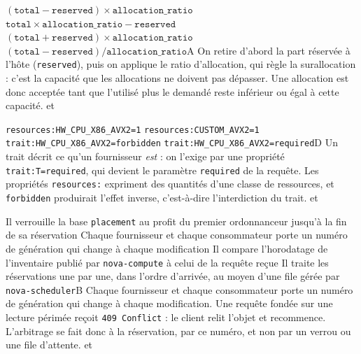   {$(\texttt{total}-\texttt{reserved})\times\texttt{allocation\_ratio}$}
  {$\texttt{total}\times\texttt{allocation\_ratio}-\texttt{reserved}$}
  {$(\texttt{total}+\texttt{reserved})\times\texttt{allocation\_ratio}$}
  {$(\texttt{total}-\texttt{reserved})/\texttt{allocation\_ratio}$}{A}
  {On retire d'abord la part réservée à l'hôte (\texttt{reserved}), puis on applique le ratio d'allocation, qui règle la surallocation : c'est la capacité que les allocations ne doivent pas dépasser. Une allocation est donc acceptée tant que l'utilisé plus le demandé reste inférieur ou égal à cette capacité.}
  { et }

  {\texttt{resources:HW\_CPU\_X86\_AVX2=1}}
  {\texttt{resources:CUSTOM\_AVX2=1}}
  {\texttt{trait:HW\_CPU\_X86\_AVX2=forbidden}}
  {\texttt{trait:HW\_CPU\_X86\_AVX2=required}}{D}
  {Un trait décrit ce qu'un fournisseur \emph{est} : on l'exige par une propriété \texttt{trait:T=required}, qui devient le paramètre \texttt{required} de la requête. Les propriétés \texttt{resources:} expriment des quantités d'une classe de ressources, et \texttt{forbidden} produirait l'effet inverse, c'est-à-dire l'interdiction du trait.}
  { et }

  {Il verrouille la base \texttt{placement} au profit du premier ordonnanceur jusqu'à la fin de sa réservation}
  {Chaque fournisseur et chaque consommateur porte un numéro de génération qui change à chaque modification}
  {Il compare l'horodatage de l'inventaire publié par \texttt{nova-compute} à celui de la requête reçue}
  {Il traite les réservations une par une, dans l'ordre d'arrivée, au moyen d'une file gérée par \texttt{nova-scheduler}}{B}
  {Chaque fournisseur et chaque consommateur porte un numéro de génération qui change à chaque modification. Une requête fondée sur une lecture périmée reçoit \texttt{409 Conflict} : le client relit l'objet et recommence. L'arbitrage se fait donc à la réservation, par ce numéro, et non par un verrou ou une file d'attente.}
  { et }

